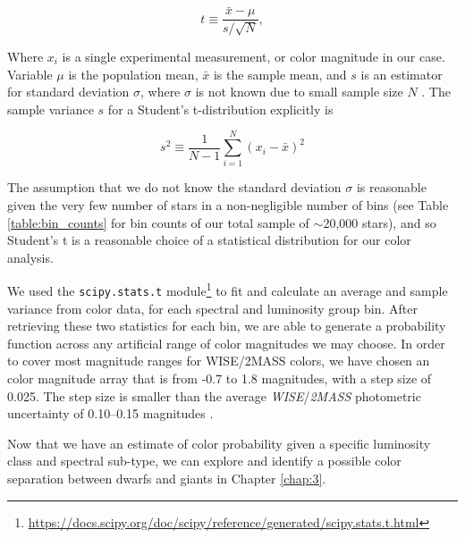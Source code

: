 \begin{equation}
    t \equiv \frac{\bar{x}-\mu}{s/\sqrt{N}} ,
\end{equation}

Where $x_{i}$ is a single experimental measurement, or color magnitude in our case. Variable $\mu$ is the population mean, $\bar{x}$ is the sample mean, and $s$ is an estimator for standard deviation $\sigma$, where $\sigma$ is not known due to small sample size $N$ \citep[student-t-citation][]{student-t}. The sample variance $s$ for a Student's t-distribution explicitly is

\begin{equation}
    s^2 \equiv \frac{1}{N-1}\sum_{i=1}^{N} (x_{i}-\bar{x})^2
\end{equation}

The assumption that we do not know the standard deviation $\sigma$ is reasonable given the very few number of stars in a non-negligible number of bins (see Table \ref{table:bin_counts} for bin counts of our total sample of $\sim$20,000 stars), and so Student's t is a reasonable choice of a statistical distribution for our color analysis.

We used the \texttt{scipy.stats.t} module\footnote{\url{https://docs.scipy.org/doc/scipy/reference/generated/scipy.stats.t.html}} to fit and calculate an average and sample variance from color data, for each spectral and luminosity group bin. After retrieving these two statistics for each bin, we are able to generate a probability function across any artificial range of color magnitudes we may choose. In order to cover most magnitude ranges for WISE/2MASS colors, we have chosen an color magnitude array that is from -0.7 to 1.8 magnitudes, with a step size of 0.025. The step size is smaller than the average \textit{WISE}/\textit{2MASS} photometric uncertainty of 0.10--0.15 magnitudes \citep{2MASS,ALLWISE}. 

Now that we have an estimate of color probability given a specific luminosity class and spectral sub-type, we can explore and identify a possible color separation between dwarfs and giants in Chapter \ref{chap:3}. 


